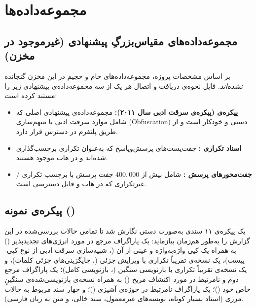 \documentclass[11pt,a4paper]{article}
\begin{document}
	
	\section{مجموعه‌داده‌ها}
	\label{sec:pairs-dataset}
	
	\subsection{مجموعه‌داده‌های مقیاس‌بزرگِ پیشنهادی (غیرموجود در مخزن)}
	
	بر اساس مشخصات پروژه، مجموعه‌داده‌های خام و حجیم در این مخزن گنجانده \emph{نشده‌اند}. فایل  نحوه‌ی دریافت و اتصال هر یک از سه مجموعه‌داده‌ی پیشنهادی زیر را مستند کرده است:
	
	\begin{itemize}
		\item \textbf{پیکره‌ی  (پیکره‌ی سرقت ادبی  سال ۲۰۱۱):} مجموعه‌داده‌ی پیشنهادی اصلی که شامل موارد سرقت ادبی با مبهم‌سازی (Obfuscation) دستی و خودکار است و از طریق پلتفرم  در دسترس قرار دارد.
		\item \textbf{اسناد تکراری :} جفت‌پست‌های پرسش‌وپاسخ که به‌عنوان تکراری برچسب‌گذاری شده‌اند و در هاب  موجود هستند.
		\item \textbf{جفت‌محورهای پرسش :} شامل بیش از $400{,}000$ جفت پرسش با برچسب تکراری / غیرتکراری که در هاب  و  قابل دسترسی است.
	\end{itemize}
	
	\subsection{پیکره‌ی نمونه ()}
	
	یک پیکره‌ی ۱۱ سندی به‌صورت دستی نگارش شد تا تمامی حالات بررسی‌شده در این گزارش را به‌طور هم‌زمان بیازماید:
	یک پاراگراف مرجع در مورد انرژی‌های تجدیدپذیر () به همراه یک کپی واژه‌به‌واژه و عینی از آن (، شبیه‌سازی سرقت ادبی از نوع کپی-پیست)، یک نسخه‌ی تقریباً تکراری با ویرایش جزئی (، جایگزینی‌های جزئی کلمات)، و یک نسخه‌ی تقریباً تکراری با بازنویسی سنگین (، بازنویسی کامل)؛ یک پاراگراف مرجع دوم و نامرتبط در مورد اکتشاف مریخ () به همراه نسخه‌ی بازنویسی‌شده‌ی سنگینِ خاص خود ()؛ یک پاراگراف نامرتبط در حوزه‌ی آشپزی ()؛ و چهار سند مربوط به حالات مرزی (اسناد بسیار کوتاه، نویسه‌های غیرمعمول، سند خالی، و متن به زبان فارسی).
	
\end{document}
